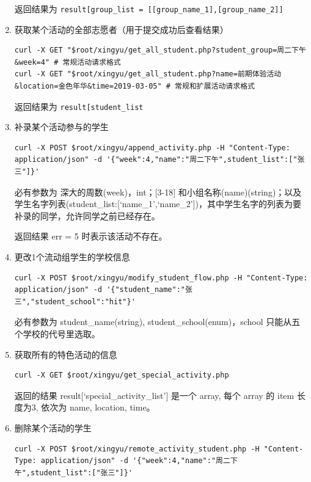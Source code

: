 \documentclass[]{ctexart}
\begin{document}
\begin{enumerate}
返回结果为
\texttt{result{[}\textquotesingle{}group\_list\textquotesingle{}{]}\ =\ {[}{[}group\_name\_1{]},{[}group\_name\_2{]}{]}}

\item
  获取某个活动的全部志愿者（用于提交成功后查看结果）
\begin{lstlisting}
curl -X GET "$root/xingyu/get_all_student.php?student_group=周二下午&week=4" # 常规活动请求格式
curl -X GET "$root/xingyu/get_all_student.php?name=前期体验活动&location=金色年华&time=2019-03-05" # 常规和扩展活动请求格式
\end{lstlisting}

返回结果为
\texttt{result{[}\textquotesingle{}student\_list\textquotesingle{}{]}}

\item
  补录某个活动参与的学生

\begin{lstlisting}
curl -X POST $root/xingyu/append_activity.php -H "Content-Type: application/json" -d '{"week":4,"name":"周二下午",student_list":["张三"]}'
\end{lstlisting}

必有参数为 深大的周数(week)，int；{[}3-18{]}
和小组名称(name)(string)；以及学生名字列表(student\_list:{[}`name\_1',`name\_2'{]})，其中学生名字的列表为要
补录的同学，允许同学之前已经存在。

返回结果 err = 5 时表示该活动不存在。

\item
  更改1个流动组学生的学校信息
\begin{lstlisting}
curl -X POST $root/xingyu/modify_student_flow.php -H "Content-Type: application/json" -d '{"student_name":"张三","student_school":"hit"}'
\end{lstlisting}

必有参数为 student\_name(string), student\_school(enum)，school
只能从五个学校的代号里选取。

\item
  获取所有的特色活动的信息
\begin{lstlisting}
curl -X GET $root/xingyu/get_special_activity.php
\end{lstlisting}

返回的结果 result{[}`special\_activity\_list'{]} 是一个 array, 每个
array 的 item 长度为3, 依次为 name, location, time。

\item
  删除某个活动的学生
\begin{lstlisting}
curl -X POST $root/xingyu/remote_activity_student.php -H "Content-Type: application/json" -d '{"week":4,"name":"周二下午",student_list":["张三"]}'
\end{lstlisting}


\end{enumerate}
\end{document}
